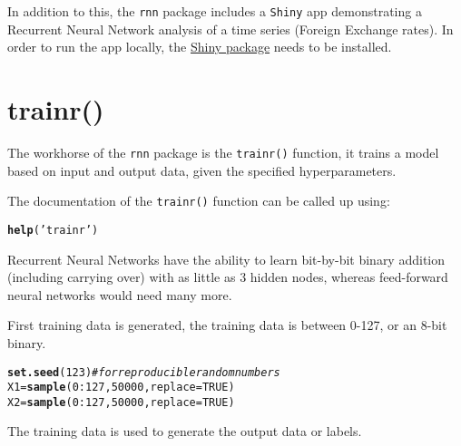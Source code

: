 \documentclass[english,article]{article}\usepackage[]{graphicx}\usepackage[]{color}
\makeatletter
\newcommand{\hlnum}[1]{\textcolor[rgb]{0.686,0.059,0.569}{#1}}%
\newcommand{\hlstr}[1]{\textcolor[rgb]{0.192,0.494,0.8}{#1}}%
\newcommand{\hlcom}[1]{\textcolor[rgb]{0.678,0.584,0.686}{\textit{#1}}}%
\newcommand{\hlopt}[1]{\textcolor[rgb]{0,0,0}{#1}}%
\newcommand{\hlstd}[1]{\textcolor[rgb]{0.345,0.345,0.345}{#1}}%
\newcommand{\hlkwb}[1]{\textcolor[rgb]{0.69,0.353,0.396}{#1}}%
\newcommand{\hlkwc}[1]{\textcolor[rgb]{0.333,0.667,0.333}{#1}}%
\newcommand{\hlkwd}[1]{\textcolor[rgb]{0.737,0.353,0.396}{\textbf{#1}}}%
\newenvironment{kframe}{%
 \def\at@end@of@kframe{}%
 \ifinner\ifhmode%
  \def\at@end@of@kframe{\end{minipage}}%
  \begin{minipage}{\columnwidth}%
 \fi\fi%
 \def\FrameCommand##1{\hskip\@totalleftmargin \hskip-\fboxsep
 \colorbox{shadecolor}{##1}\hskip-\fboxsep
     \hskip-\linewidth \hskip-\@totalleftmargin \hskip\columnwidth}%
 \MakeFramed {\advance\hsize-\width
   \@totalleftmargin\z@ \linewidth\hsize
   \@setminipage}}%
 {\par\unskip\endMakeFramed%
 \at@end@of@kframe}
\newenvironment{knitrout}{}{} %
\providecommand*{\code}[1]{\texttt{#1}}
\makeatother
\begin{document}
In addition to this, the \code{rnn} package includes a \code{Shiny}
app demonstrating a Recurrent Neural Network analysis of a time series
(Foreign Exchange rates). In order to run the app locally, the \href{https://cran.r-project.org/package\%3Dshiny}{Shiny package}
needs to be installed.

\section{trainr()}

The workhorse of the \code{rnn} package is the \code{trainr()} function,
it trains a model based on input and output data, given the specified
hyperparameters.

The documentation of the \code{trainr()} function can be called up
using:

\begin{knitrout}
\color{fgcolor}\begin{kframe}
\begin{alltt}
\hlkwd{help}\hlstd{(}\hlstr{'trainr'}\hlstd{)}
\end{alltt}
\end{kframe}
\end{knitrout}

Recurrent Neural Networks \citep{werbos1988generalization} have the
ability to learn bit-by-bit binary addition (including carrying over)
with as little as 3 hidden nodes, whereas feed-forward neural networks
would need many more.

First training data is generated, the training data is between 0-127,
or an 8-bit binary.

\begin{knitrout}
\color{fgcolor}\begin{kframe}
\begin{alltt}
\hlkwd{set.seed}\hlstd{(}\hlnum{123}\hlstd{)} \hlcom{# for reproducible random numbers}
\hlstd{X1} \hlkwb{=} \hlkwd{sample}\hlstd{(}\hlnum{0}\hlopt{:}\hlnum{127}\hlstd{,} \hlnum{50000}\hlstd{,} \hlkwc{replace}\hlstd{=}\hlnum{TRUE}\hlstd{)}
\hlstd{X2} \hlkwb{=} \hlkwd{sample}\hlstd{(}\hlnum{0}\hlopt{:}\hlnum{127}\hlstd{,} \hlnum{50000}\hlstd{,} \hlkwc{replace}\hlstd{=}\hlnum{TRUE}\hlstd{)}
\end{alltt}
\end{kframe}
\end{knitrout}

The training data is used to generate the output data or labels.
\end{document}
